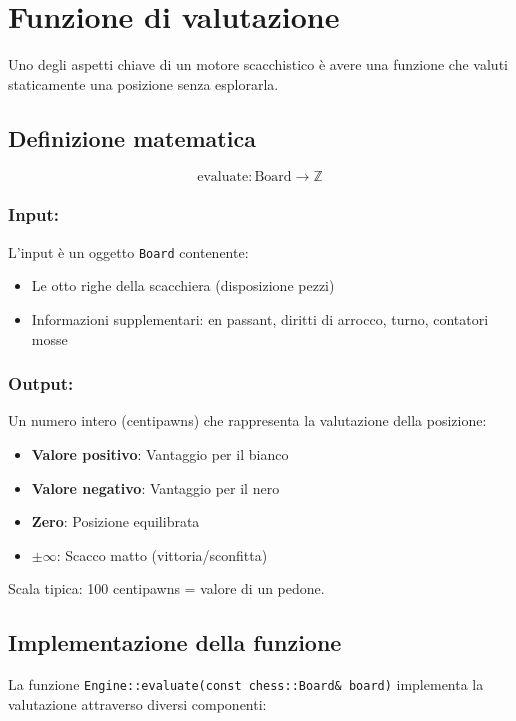 \section{Funzione di valutazione}

Uno degli aspetti chiave di un motore scacchistico è
avere una funzione che valuti staticamente una posizione senza esplorarla.

\subsection{Definizione matematica}

$$ \text{evaluate}: \text{Board} \longrightarrow \mathbb{Z} $$

\subsubsection{Input:}
L'input è un oggetto \texttt{Board} contenente:
\begin{itemize}
\item Le otto righe della scacchiera (disposizione pezzi)
\item Informazioni supplementari: en passant, diritti di arrocco, turno, contatori mosse
\end{itemize}

\subsubsection{Output:}
Un numero intero (centipawns) che rappresenta la valutazione della posizione:
\begin{itemize}
\item \textbf{Valore positivo}: Vantaggio per il bianco
\item \textbf{Valore negativo}: Vantaggio per il nero
\item \textbf{Zero}: Posizione equilibrata
\item \textbf{$\pm\infty$}: Scacco matto (vittoria/sconfitta)
\end{itemize}

Scala tipica: 100 centipawns = valore di un pedone.

\subsection{Implementazione della funzione}

La funzione \texttt{Engine::evaluate(const chess::Board\& board)} implementa
la valutazione attraverso diversi componenti:


